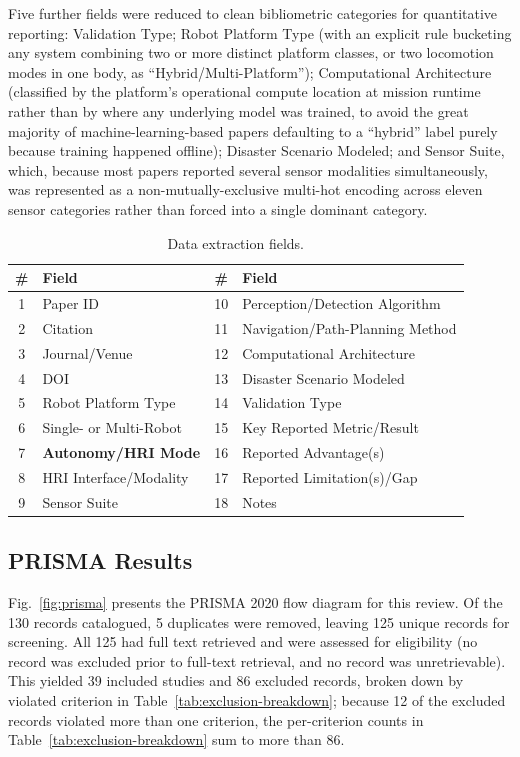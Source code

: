 \documentclass[journal]{IEEEtran}
\begin{document}
Five further fields were reduced to clean bibliometric categories for quantitative reporting: Validation Type; Robot Platform Type (with an explicit rule bucketing any system combining two or more distinct platform classes, or two locomotion modes in one body, as ``Hybrid/Multi-Platform''); Computational Architecture (classified by the platform's operational compute location at mission runtime rather than by where any underlying model was trained, to avoid the great majority of machine-learning-based papers defaulting to a ``hybrid'' label purely because training happened offline); Disaster Scenario Modeled; and Sensor Suite, which, because most papers reported several sensor modalities simultaneously, was represented as a non-mutually-exclusive multi-hot encoding across eleven sensor categories rather than forced into a single dominant category.

\begin{table}[t]
\caption{Data extraction fields.}
\label{tab:extraction-fields}
\centering
\begin{tabular}{@{}clcl@{}}
\toprule
\textbf{\#} & \textbf{Field} & \textbf{\#} & \textbf{Field} \\
\midrule
1 & Paper ID & 10 & Perception/Detection Algorithm \\
2 & Citation & 11 & Navigation/Path-Planning Method \\
3 & Journal/Venue & 12 & Computational Architecture \\
4 & DOI & 13 & Disaster Scenario Modeled \\
5 & Robot Platform Type & 14 & Validation Type \\
6 & Single- or Multi-Robot & 15 & Key Reported Metric/Result \\
7 & \textbf{Autonomy/HRI Mode} & 16 & Reported Advantage(s) \\
8 & HRI Interface/Modality & 17 & Reported Limitation(s)/Gap \\
9 & Sensor Suite & 18 & Notes \\
\bottomrule
\end{tabular}
\end{table}


\subsection{PRISMA Results}

Fig.~\ref{fig:prisma} presents the PRISMA 2020 flow diagram for this review. Of the 130 records catalogued, 5 duplicates were removed, leaving 125 unique records for screening. All 125 had full text retrieved and were assessed for eligibility (no record was excluded prior to full-text retrieval, and no record was unretrievable). This yielded 39 included studies and 86 excluded records, broken down by violated criterion in Table~\ref{tab:exclusion-breakdown}; because 12 of the excluded records violated more than one criterion, the per-criterion counts in Table~\ref{tab:exclusion-breakdown} sum to more than 86.
\end{document}
